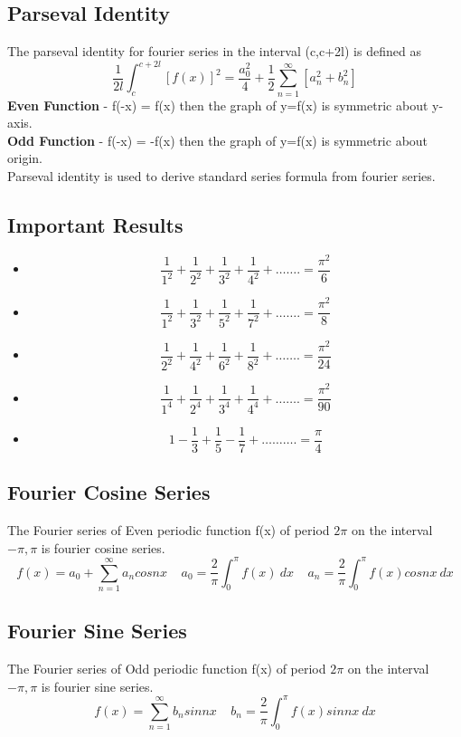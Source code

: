 \subsection*{Parseval Identity}
The parseval identity for fourier series in the interval (c,c+2l) is defined as
\[\frac{1}{2l}\int_c^{c+2l}[f(x)]^2=\frac{a_0^2}{4}+\frac{1}{2}\sum_{n=1}^{\infty}\left[a_n^2+b_n^2\right]\]
\textbf{Even Function} - f(-x) = f(x) then the graph of y=f(x) is symmetric about y-axis.\vspace{0.3cm}\\
\textbf{Odd Function} - f(-x) = -f(x) then the graph of y=f(x) is symmetric about origin.\vspace{0.3cm}\\
Parseval identity is used to derive standard series formula from fourier series.\\

\subsection*{Important Results}
\begin{multicols}{2}
\begin{itemize}[label={}]
    \item \[\frac{1}{1^2}+\frac{1}{2^2}+\frac{1}{3^2}+\frac{1}{4^2}+\ldots\ldots.=\frac{\pi^2}{6}\]
    \item \[\frac{1}{1^2}+\frac{1}{3^2}+\frac{1}{5^2}+\frac{1}{7^2}+\ldots\ldots.=\frac{\pi^2}{8}\]
    \item \[\frac{1}{2^2}+\frac{1}{4^2}+\frac{1}{6^2}+\frac{1}{8^2}+\ldots\ldots.=\frac{\pi^2}{24}\]
    \item \[\frac{1}{1^4}+\frac{1}{2^4}+\frac{1}{3^4}+\frac{1}{4^4}+\ldots\ldots.=\frac{\pi^2}{90}\]
    \item \[1-\frac{1}{3}+\frac{1}{5}-\frac{1}{7}+\ldots\ldots\ldots.=\frac{\pi}{4}\]
\end{itemize}
\end{multicols}

\subsection*{Fourier Cosine Series}
The Fourier series of Even periodic function f(x) of period \(2\pi\) on the interval \(-\pi, \pi\) is fourier cosine series.
\[f(x)=a_0+\sum_{n=1}^{\infty}a_n cosnx\ \ \ \ \ a_0=\frac{2}{\pi}\int_0^{\pi}f(x)\ dx\ \ \ \ \ a_n=\frac{2}{\pi}\int_0^{\pi}f(x)cosnx\ dx\]

\subsection*{Fourier Sine Series}
The Fourier series of Odd periodic function f(x) of period \(2\pi\) on the interval \(-\pi, \pi\) is fourier sine series.
\[f(x)=\sum_{n=1}^{\infty}b_n sinnx\ \ \ \ \ b_n=\frac{2}{\pi}\int_0^{\pi}f(x)sinnx\ dx\]


